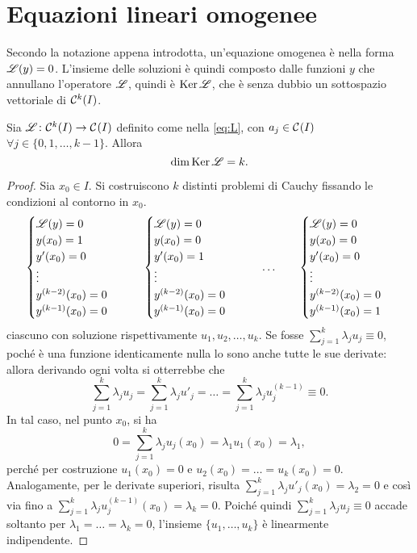 \section{Equazioni lineari omogenee}
Secondo la notazione appena introdotta, un'equazione omogenea è nella forma $\mathscr L(y)=0$. L'insieme delle soluzioni è quindi composto dalle funzioni $y$ che annullano l'operatore $\mathscr L$, quindi è $\operatorname{Ker}\mathscr L$, che è senza dubbio un sottospazio vettoriale di $\mathcal{C}^{{k}}(I)$.
\begin{teorema} \label{t:k-soluzioni}
Sia $\mathscr L\colon\mathcal{C}^{{k}}(I)\to\mathcal{C}^{{}}(I)$ definito come nella \eqref{eq:L}, con $a_j\in\mathcal{C}^{{}}(I)$ $\forall j\in\{0,1,\dots,k-1\}$. Allora
\[
\dim\operatorname{Ker}\mathscr L=k.
\]
\end{teorema}
\begin{proof}
Sia $x_0\in I$. Si costruiscono $k$ distinti problemi di Cauchy fissando le condizioni al contorno in $x_0$.
\begin{equation*}
	\begin{cases}
		\mathscr L(y)=0\\y(x_0)=1\\y'(x_0)=0\\\vdots\\y^{(k-2)}(x_0)=0\\y^{(k-1)}(x_0)=0
	\end{cases}
	\qquad
	\begin{cases}
		\mathscr L(y)=0\\y(x_0)=0\\y'(x_0)=1\\\vdots\\y^{(k-2)}(x_0)=0\\y^{(k-1)}(x_0)=0
	\end{cases}
	\qquad\dots\qquad
	\begin{cases}
		\mathscr L(y)=0\\y(x_0)=0\\y'(x_0)=0\\\vdots\\y^{(k-2)}(x_0)=0\\y^{(k-1)}(x_0)=1
	\end{cases}
\end{equation*}
ciascuno con soluzione rispettivamente $u_1,u_2,\dots,u_k$.
Se fosse $\sum_{j=1}^k\lambda_ju_j\equiv 0$, poché è una funzione identicamente nulla lo sono anche tutte le sue derivate: allora derivando ogni volta si otterrebbe che
\begin{equation*}
	\sum_{j=1}^k\lambda_ju_j=\sum_{j=1}^k\lambda_ju'_j=\dots=\sum_{j=1}^k\lambda_ju^{(k-1)}_j\equiv 0.
\end{equation*}
In tal caso, nel punto $x_0$, si ha
\begin{equation*}
	0=\sum_{j=1}^k\lambda_ju_j(x_0)=\lambda_1u_1(x_0)=\lambda_1,
\end{equation*}
perché per costruzione $u_1(x_0)=0$ e $u_2(x_0)=\dots=u_k(x_0)=0$. Analogamente, per le derivate superiori, risulta $\sum_{j=1}^k\lambda_ju'_j(x_0)=\lambda_2=0$ e così via fino a $\sum_{j=1}^k\lambda_ju^{(k-1)}_j(x_0)=\lambda_k=0$. Poiché quindi $\sum_{j=1}^k\lambda_ju_j\equiv 0$ accade soltanto per $\lambda_1=\dots=\lambda_k=0$, l'insieme $\{u_1,\dots,u_k\}$ è linearmente indipendente.


\end{proof}

